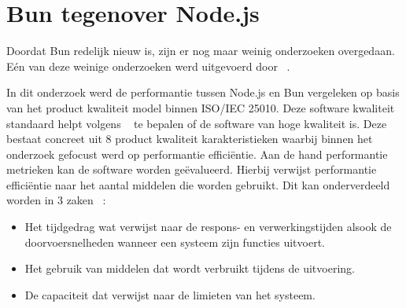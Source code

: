 \section{Bun tegenover Node.js}
Doordat Bun redelijk nieuw is, zijn er nog maar weinig onderzoeken overgedaan. Eén van deze weinige
onderzoeken werd uitgevoerd door ~\textcite{Feroj2023}. 

In dit onderzoek werd de performantie tussen Node.js en Bun vergeleken op basis van het product kwaliteit model binnen ISO/IEC 25010.
Deze software kwaliteit standaard helpt volgens ~\textcite{Britton2021} te bepalen of de software van hoge kwaliteit is.
Deze bestaat concreet uit 8 product kwaliteit karakteristieken waarbij binnen het onderzoek gefocust werd op performantie efficiëntie.
Aan de hand performantie metrieken kan de software worden geëvalueerd. 
Hierbij verwijst performantie efficiëntie naar het aantal middelen die worden gebruikt.
Dit kan onderverdeeld worden in 3 zaken ~\autocite{Britton2021}:
\begin{itemize}
    \item Het tijdgedrag wat verwijst naar de respons- en verwerkingstijden alsook de doorvoersnelheden wanneer een systeem zijn functies uitvoert.
    \item Het gebruik van middelen dat wordt verbruikt tijdens de uitvoering.
    \item De capaciteit dat verwijst naar de limieten van het systeem.
\end{itemize}



